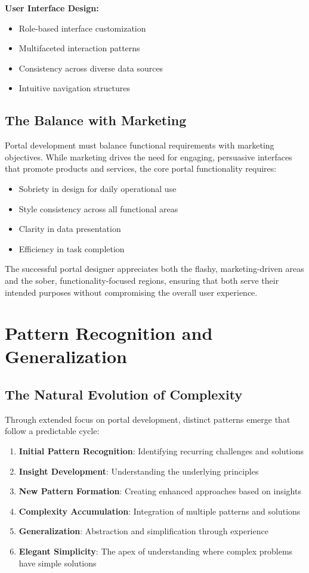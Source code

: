 \textbf{User Interface Design:}
\begin{itemize}
\item Role-based interface customization
\item Multifaceted interaction patterns
\item Consistency across diverse data sources
\item Intuitive navigation structures
\end{itemize}

\subsection{The Balance with Marketing}

Portal development must balance functional requirements with marketing objectives. While marketing drives the need for engaging, persuasive interfaces that promote products and services, the core portal functionality requires:

\begin{itemize}
\item Sobriety in design for daily operational use
\item Style consistency across all functional areas
\item Clarity in data presentation
\item Efficiency in task completion
\end{itemize}

The successful portal designer appreciates both the flashy, marketing-driven areas and the sober, functionality-focused regions, ensuring that both serve their intended purposes without compromising the overall user experience.

\section{Pattern Recognition and Generalization}

\subsection{The Natural Evolution of Complexity}

Through extended focus on portal development, distinct patterns emerge that follow a predictable cycle:

\begin{enumerate}
\item \textbf{Initial Pattern Recognition}: Identifying recurring challenges and solutions
\item \textbf{Insight Development}: Understanding the underlying principles
\item \textbf{New Pattern Formation}: Creating enhanced approaches based on insights
\item \textbf{Complexity Accumulation}: Integration of multiple patterns and solutions
\item \textbf{Generalization}: Abstraction and simplification through experience
\item \textbf{Elegant Simplicity}: The apex of understanding where complex problems have simple solutions
\end{enumerate}

